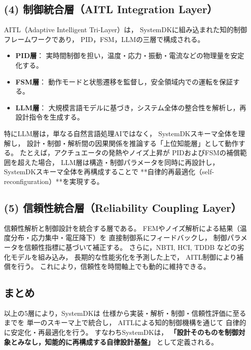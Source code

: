 \subsection{(4) 制御統合層（AITL Integration Layer）}
AITL（Adaptive Intelligent Tri-Layer）は，
SystemDKに組み込まれた知的制御フレームワークであり，
PID，FSM，LLMの三層で構成される。

\begin{itemize}
  \item \textbf{PID層}： 実時間制御を担い，温度・応力・振動・電流などの物理量を安定化する。
  \item \textbf{FSM層}： 動作モードと状態遷移を監督し，安全領域内での運転を保証する。
  \item \textbf{LLM層}： 大規模言語モデルに基づき，システム全体の整合性を解析し，再設計指令を生成する。
\end{itemize}

特にLLM層は，単なる自然言語処理AIではなく，
SystemDKスキーマ全体を理解し，
設計・制御・解析間の因果関係を推論する「上位知能層」として動作する。
たとえば，アクチュエータの発熱やノイズ上昇が
PIDおよびFSMの補償範囲を超えた場合，
LLM層は構造・制御パラメータを同時に再設計し，
SystemDKスキーマ全体を再構成することで
**自律的再最適化（self-reconfiguration）**を実現する。

\subsection{(5) 信頼性統合層（Reliability Coupling Layer）}
信頼性解析と制御設計を統合する層である。
FEMやノイズ解析による結果（温度分布・応力集中・電圧降下）を
直接制御系にフィードバックし，
制御パラメータを信頼性指標に基づいて補正する。
さらに，NBTI, HCI, TDDB などの劣化モデルを組み込み，
長期的な性能劣化を予測した上で，
AITL制御により補償を行う。
これにより，信頼性を時間軸上でも動的に維持できる。

\subsection*{まとめ}
以上の5層により，SystemDKは
仕様から実装・解析・制御・信頼性評価に至るまでを
単一のスキーマ上で統合し，
AITLによる知的制御機構を通じて
自律的に安定化・再最適化を行う。
すなわちSystemDKは，
\textbf{「設計そのものを制御対象とみなし，知能的に再構成する自律設計基盤」}
として定義される。
